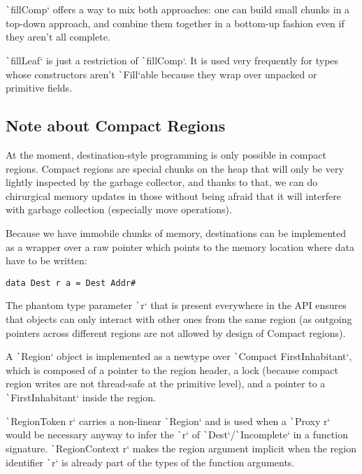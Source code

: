 \documentclass[english]{jflart}
\begin{document}
\texttt`fillComp` offers a way to mix both approaches: one can build small chunks in a top-down approach, and combine them together in a bottom-up fashion even if they aren't all complete.

\texttt`fillLeaf` is just a restriction of \texttt`fillComp`. It is used very frequently for types whose constructors aren't \texttt`Fill`able because they wrap over unpacked or primitive fields.

\subsection{Note about Compact Regions}

At the moment, destination-style programming is only possible in compact regions. Compact regions are special chunks on the heap that will only be very lightly inspected by the garbage collector, and thanks to that, we can do chirurgical memory updates in those without being afraid that it will interfere with garbage collection (especially move operations).

Because we have immobile chunks of memory, destinations can be implemented as a wrapper over a raw pointer which points to the memory location where data have to be written:

\begin{verbatim}
data Dest r a = Dest Addr#
\end{verbatim}

The phantom type parameter \texttt`r` that is present everywhere in the API ensures that objects can only interact with other ones from the same region (as outgoing pointers across different regions are not allowed by design of Compact regions).

A \texttt`Region` object is implemented as a newtype over \texttt`Compact FirstInhabitant`, which is composed of a pointer to the region header, a lock (because compact region writes are not thread-safe at the primitive level), and a pointer to a \texttt`FirstInhabitant` inside the region.

\texttt`RegionToken r` carries a non-linear \texttt`Region` and is used when a \texttt`Proxy r` would be necessary anyway to infer the \texttt`r` of \texttt`Dest`/\texttt`Incomplete` in a function signature. \texttt`RegionContext r` makes the region argument implicit when the region identifier \texttt`r` is already part of the types of the function arguments.
\end{document}
